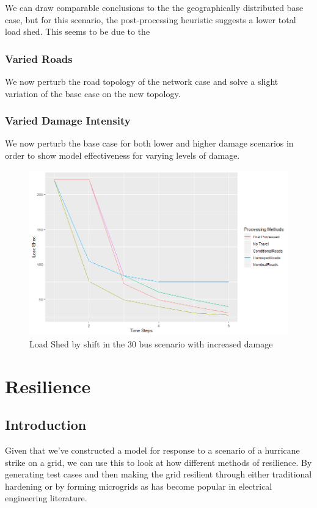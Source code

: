 \documentclass{article}
\begin{document}
	We can draw comparable conclusions to the the geographically distributed base case, but for this scenario, the post-processing heuristic suggests a lower total load shed. This seems to be due to the 
	\subsubsection{Varied Roads}
	We now perturb the road topology of the network case and solve a slight variation of the base case on the new topology.
	
	\subsubsection{Varied Damage Intensity}
	We now perturb the base case for both lower and higher damage scenarios in order to show model effectiveness for varying levels of damage.
	\begin{figure}[H]
		\centering
		\includegraphics[width=.9\linewidth]{Rplot30scenario2.png}
		\caption{Load Shed by shift in the 30 bus scenario with increased damage}
		\label{fig:sub2}
		
		
	\end{figure}

	\section{Resilience}
	\subsection{Introduction}
	Given that we've constructed a model for response to a scenario of a hurricane strike on a grid, we can use this to look at how different methods of resilience. By generating test cases and then making the grid resilient through either traditional hardening or by forming microgrids as has become popular in electrical engineering literature.
\end{document}
